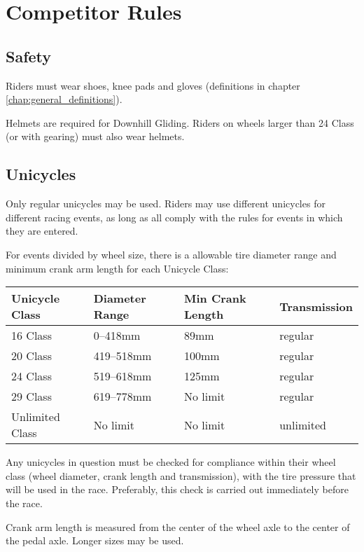 \chapter{Competitor Rules}

\section{Safety}

Riders must wear shoes, knee pads and gloves (definitions in chapter \ref{chap:general_definitions}).

Helmets are required for Downhill Gliding.
Riders on wheels larger than 24 Class (or with gearing) must also wear helmets.

\section{Unicycles}

Only regular unicycles may be used.
Riders may use different unicycles for different racing events, as long as all comply with the rules for events in which they are entered.

For events divided by wheel size, there is a allowable tire diameter range and minimum crank arm length for each Unicycle Class:

\begin{longtable}{|p{3cm}|p{3.5cm}|p{4cm}|p{3cm}|}
\hline
\textbf{Unicycle Class} & \textbf{Diameter Range} & \textbf{Min Crank Length} & \textbf{Transmission}\\
\hline
16 Class & 0--418mm & 89mm & regular \\
\hline
20 Class & 419--518mm & 100mm & regular \\
\hline
24 Class & 519--618mm & 125mm & regular \\
\hline
29 Class & 619--778mm & No limit & regular \\
\hline
Unlimited Class & No limit & No limit & unlimited \\
\hline
\end{longtable}

Any unicycles in question must be checked for compliance within their wheel class (wheel diameter, crank length and transmission), with the tire pressure that will be used in the race.
Preferably, this check is carried out immediately before the race.

Crank arm length is measured from the center of the wheel axle to the center of the pedal axle.
Longer sizes may be used.

